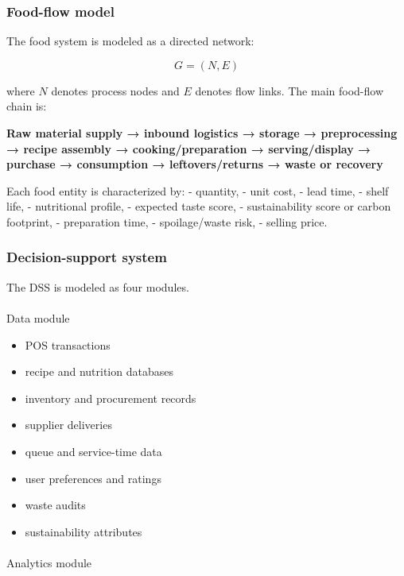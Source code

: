 \documentclass[
  letterpaper,
  DIV=11,
  numbers=noendperiod]{scrartcl}
\makeatletter
\let\oldparagraph\paragraph
\renewcommand{\paragraph}{
    \@ifstar
      \xxxParagraphStar
      \xxxParagraphNoStar
  }
\newcommand{\xxxParagraphStar}[1]{\oldparagraph*{#1}\mbox{}}
\newcommand{\xxxParagraphNoStar}[1]{\oldparagraph{#1}\mbox{}}
\providecommand{\tightlist}{%
  \setlength{\itemsep}{0pt}\setlength{\parskip}{0pt}}
\makeatother
\begin{document}
\subsubsection{Food-flow model}\label{food-flow-model}

The food system is modeled as a directed network:

\[G = (N,E)\]

where \(N\) denotes process nodes and \(E\) denotes flow links. The main
food-flow chain is:

\textbf{Raw material supply → inbound logistics → storage →
preprocessing → recipe assembly → cooking/preparation → serving/display
→ purchase → consumption → leftovers/returns → waste or recovery}

Each food entity is characterized by: - quantity, - unit cost, - lead
time, - shelf life, - nutritional profile, - expected taste score, -
sustainability score or carbon footprint, - preparation time, -
spoilage/waste risk, - selling price.

\subsubsection{Decision-support system}\label{decision-support-system}

The DSS is modeled as four modules.

\paragraph{Data module}\label{data-module}

\begin{itemize}
\tightlist
\item
  POS transactions
\item
  recipe and nutrition databases
\item
  inventory and procurement records
\item
  supplier deliveries
\item
  queue and service-time data
\item
  user preferences and ratings
\item
  waste audits
\item
  sustainability attributes
\end{itemize}

\paragraph{Analytics module}\label{analytics-module}
\end{document}
